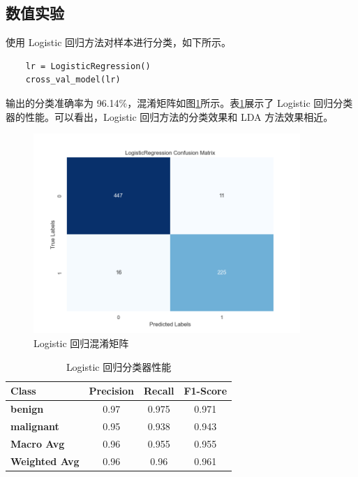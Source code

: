 \documentclass[a4paper,12pt,onecolumn,oneside]{article}
\begin{document}
\subsection{数值实验}
使用 Logistic 回归方法对样本进行分类，如下所示。
\lstset{language=Python}
\lstset{frame=lines}
\lstset{basicstyle=\footnotesize}
\begin{lstlisting}
	lr = LogisticRegression()
	cross_val_model(lr)
\end{lstlisting}
输出的分类准确率为 96.14\%，混淆矩阵如图\ref{fig:logistic}所示。表\ref{tbl:logistic}展示了 Logistic 回归分类器的性能。可以看出，Logistic 回归方法的分类效果和 LDA 方法效果相近。
\begin{figure}[h]
	\centering
	\includegraphics[width=0.9\textwidth]{res3/logistic.png}
	\caption{Logistic 回归混淆矩阵}
	\label{fig:logistic}
\end{figure}
\begin{table}[h]
	\centering
	\begin{tabular}{lccc}
		\toprule
		\textbf{Class} & \textbf{Precision} & \textbf{Recall} & \textbf{F1-Score} \\
		\midrule
		\textbf{benign} & 0.97 & 0.975 & 0.971 \\
		\textbf{malignant} & 0.95 & 0.938 & 0.943 \\
		\midrule
		\textbf{Macro Avg} & 0.96 & 0.955 & 0.955 \\
		\textbf{Weighted Avg} & 0.96 & 0.96 & 0.961 \\
		\bottomrule
	\end{tabular}
	\caption{Logistic 回归分类器性能}
	\label{tbl:logistic}
\end{table}
\end{document}
